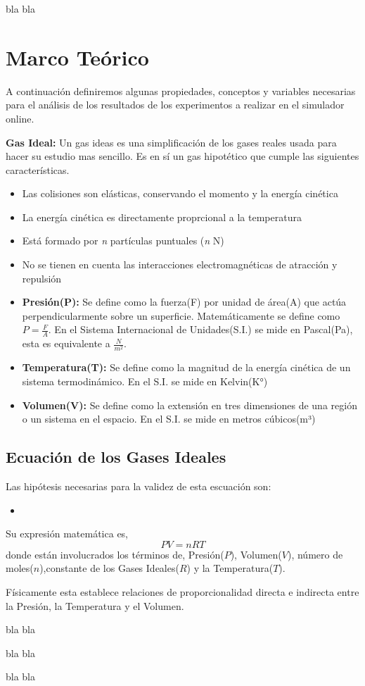 \documentclass[twoside]{report}
\begin{document}
\medskip
bla bla


\section{Marco Teórico}

A continuación definiremos algunas propiedades, conceptos y variables necesarias para el análisis de los resultados de los experimentos a realizar en el simulador online.

\textbf{Gas Ideal:} Un gas ideas es una simplificación de los gases reales usada para hacer su estudio mas sencillo. Es en sí un gas hipotético que cumple las siguientes características.
    \begin{itemize}
    \item Las colisiones son elásticas, conservando el momento y la energía cinética
    \item La energía cinética es directamente proprcional a la temperatura
    \item Está formado por \textit{n} partículas puntuales (\textit{n} \in \mathbb N)
    \item No se tienen en cuenta las interacciones electromagnéticas de atracción y repulsión
\end{itemize}
\begin{itemize}
	\item \textbf{Presión(P):} Se define como la fuerza(F) por unidad de área(A) que actúa perpendicularmente sobre un superficie. Matemáticamente se define como  $ P= \frac{F}{A} $. En el Sistema Internacional de Unidades(S.I.) se mide en Pascal(Pa), esta es equivalente a $\frac{N}{m^{2}}$.
	\item \textbf{Temperatura(T):} Se define como la magnitud de la energía cinética de un sistema termodinámico. En el S.I. se mide en Kelvin(K°)
        \item \textbf{Volumen(V):} Se define como la extensión en tres dimensiones de una región o un sistema en el espacio. En el S.I. se mide en metros cúbicos(m³)
\end{itemize}
\subsection*{Ecuación de los Gases Ideales}
Las hipótesis necesarias para la validez de esta escuación son:
\begin{itemize}
	\item 
\end{itemize}
Su expresión matemática es,
\begin{equation}
PV=nRT
\end{equation}
donde están involucrados los términos de, Presión($P$), Volumen($V$), número de moles($n$),constante de los Gases Ideales($R$) y la Temperatura($T$).

Físicamente esta establece relaciones de proporcionalidad directa e indirecta entre la Presión, la Temperatura y el Volumen.










\medskip
bla bla

\medskip
bla bla

\medskip
bla bla
\medskip
\end{document}
